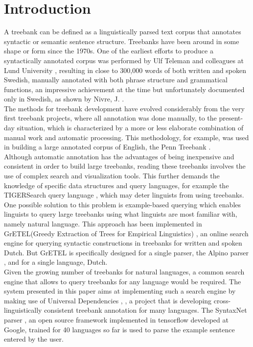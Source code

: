 \documentclass[]{scrartcl}
\theoremstyle{exmp}
\begin{document}
\section{Introduction}
A treebank can be defined as a linguistically parsed text corpus that annotates syntactic or semantic sentence structure. Treebanks have been around in some shape or form since the 1970s. One of the earliest efforts to produce a syntactically annotated corpus was performed by Ulf Teleman and colleagues at Lund University \cite{Teleman}, resulting in close to 300,000 words of both written and spoken Swedish, manually annotated with both phrase structure and grammatical functions, an impressive achievement at the time but unfortunately documented only in Swedish, as shown by Nivre, J. \cite{Nivre}. \\
The methods for treebank development have evolved considerably from the very first treebank projects, where all annotation was done manually, to the present-day situation, which is characterized by a more or less elaborate combination of manual work and automatic processing. This methodology, for example, was used in building a large annotated corpus of English, the Penn Treebank \cite{Taylor}. \\
Although automatic annotation has the advantages of being inexpensive and consistent in order to build large treebanks, reading these treebanks involves the use of complex search and visualization tools. This further demands the knowledge of specific data structures and query languages, for example the TIGERSearch query language \cite{TIGERSearch}, which may deter linguists from using treebanks. \\
One possible solution to this problem is example-based querying which enables linguists to query large treebanks using what linguists are most familiar with, namely natural language. This approach has been implemented in GrETEL(Greedy Extraction of Trees for Empirical Linguistics) \cite{GrETEL}, an online search engine for querying syntactic constructions in treebanks for written and spoken Dutch. But GrETEL is specifically designed for a single parser, the Alpino parser \cite{Alpino}, and for a single language, Dutch. \\
Given the growing number of treebanks for natural languages, a common search engine that allows to query treebanks for any language would be required. The system presented in this paper aims at implementing such a search engine by making use of Universal Dependencies \cite{UDpaper}, \cite{UDwebsite}, a project that is developing cross-linguistically consistent treebank annotation for many languages. The SyntaxNet parser \cite{Syntaxnet}, an open source framework implemented in tensorflow developed at Google, trained for 40 languages so far is used to parse the example sentence entered by the user. \\
\end{document}
